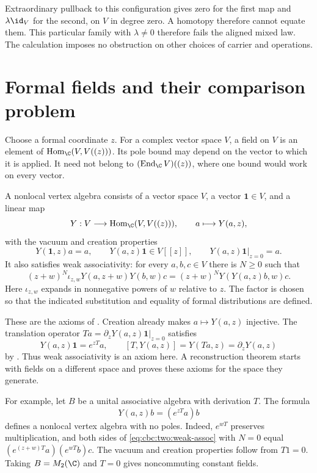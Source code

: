 Extraordinary pullback to this configuration gives zero for the first
map and $\lambda\id_V$ for the second, on $V$ in degree zero.
A homotopy therefore cannot equate them.
This particular family with $\lambda\ne0$ therefore fails the aligned
mixed law. The calculation imposes no obstruction on other choices
of carrier and operations.

\section{Formal fields and their comparison problem}
Choose a formal coordinate $z$.
For a complex vector space $V$, a field on $V$ is an element of
$\operatorname{Hom}_{\C}(V,V((z)))$.
Its pole bound may depend on the vector to which it is applied.
It need not belong to $(\operatorname{End}_{\C}V)((z))$, where one
bound would work on every vector.

\begin{definition}
\label{cbc:two:nonlocal}
A nonlocal vertex algebra consists of a vector space $V$, a vector
$\mathbf1\in V$, and a linear map
\[
 Y:V\longrightarrow\operatorname{Hom}_{\C}(V,V((z))),
 \qquad a\longmapsto Y(a,z),
\]
with the vacuum and creation properties
\[
 Y(\mathbf1,z)a=a,\qquad
 Y(a,z)\mathbf1\in V[[z]],\qquad
 Y(a,z)\mathbf1\big|_{z=0}=a.
\]
It also satisfies weak associativity: for every $a,b,c\in V$ there
is $N\geq0$ such that
\begin{equation}
 (z+w)^N\iota_{z,w}Y(a,z+w)Y(b,w)c
   =(z+w)^NY(Y(a,z)b,w)c.
 \label{eq:cbc:two:weak-assoc}
\end{equation}
Here $\iota_{z,w}$ expands in nonnegative powers of $w$ relative to $z$.
The factor is chosen so that the indicated substitution and equality
of formal distributions are defined.
\end{definition}

These are the axioms of \cite[Definition 2.3]{LiNonlocal}.
Creation already makes $a\mapsto Y(a,z)$ injective.
The translation operator
$Ta=\partial_zY(a,z)\mathbf1|_{z=0}$ satisfies
\[
 Y(a,z)\mathbf1=e^{zT}a,\qquad
 [T,Y(a,z)]=Y(Ta,z)=\partial_zY(a,z)
\]
by \cite[Lemma 2.5]{LiNonlocal}.
Thus weak associativity is an axiom here. A reconstruction theorem
starts with fields on a different space and proves these axioms for
the space they generate.

For example, let $B$ be a unital associative algebra with derivation $T$.
The formula
\[
 Y(a,z)b=(e^{zT}a)b
\]
defines a nonlocal vertex algebra with no poles.
Indeed, $e^{wT}$ preserves multiplication, and both sides of
\eqref{eq:cbc:two:weak-assoc} with $N=0$ equal
$(e^{(z+w)T}a)(e^{wT}b)c$.
The vacuum and creation properties follow from $T1=0$.
Taking $B=M_2(\C)$ and $T=0$ gives noncommuting constant fields.


